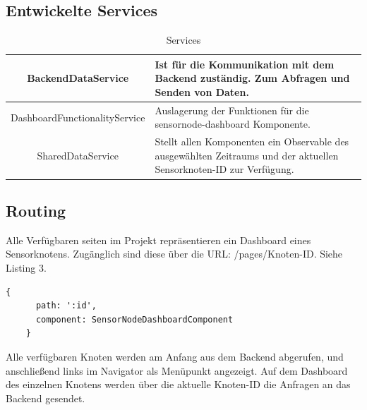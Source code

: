 \subsection{Entwickelte Services}

\renewcommand{\arraystretch}{2}
\begin{table}[ht!]
  \centering
  \begin{tabular}{|c|p{4.4cm}|}
	\hline
	BackendDataService & Ist für die Kommunikation mit dem Backend zuständig. Zum Abfragen und Senden von Daten. \\
	\hline
	DashboardFunctionalityService & Auslagerung der Funktionen für die sensornode-dashboard Komponente. \\
	\hline
	SharedDataService & Stellt allen Komponenten ein Observable des ausgewählten Zeitraums und der aktuellen Sensorknoten-ID zur Verfügung. \\
	\hline
  \end{tabular}
  \caption{Services}
  \label{tab:beispiel}
\end{table}

\subsection{Routing}
Alle Verfügbaren seiten im Projekt repräsentieren ein Dashboard eines Sensorknotens.
Zugänglich sind diese über die URL: /pages/{Knoten-ID}. Siehe Listing 3.
\begin{lstlisting}[caption={Knoten-ID Routing},captionpos=b,showstringspaces=false, basicstyle=\small,label={lst:sensor_dtype}]
    {
      path: ':id',
      component: SensorNodeDashboardComponent
    }
\end{lstlisting}
Alle verfügbaren Knoten werden am Anfang aus dem Backend abgerufen, und anschließend links im Navigator als Menüpunkt angezeigt. Auf dem Dashboard des einzelnen Knotens werden über die aktuelle Knoten-ID die Anfragen an das Backend gesendet.